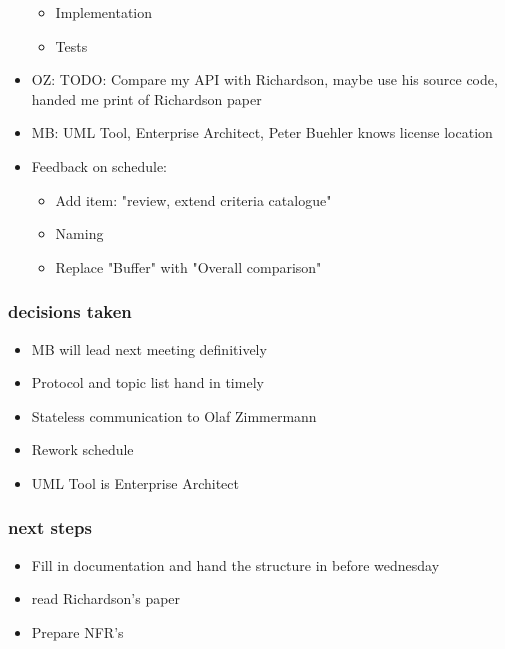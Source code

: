 \documentclass{article}
\begin{document}
\begin{itemize}
\begin{itemize}
            \item Implementation
            \item Tests
        \end{itemize}
    \item OZ: TODO: Compare my API with Richardson, maybe use his source code, handed me print of Richardson paper
    \item MB: UML Tool, Enterprise Architect, Peter Buehler knows license location
    \item Feedback on schedule:
        \begin{itemize}
            \item Add item: "review, extend criteria catalogue"
            \item Naming
            \item Replace "Buffer" with "Overall comparison"
        \end{itemize}
\end{itemize}

\subsubsection{decisions taken}
\begin{itemize}
    \item MB will lead next meeting definitively
    \item Protocol and topic list hand in timely
    \item Stateless communication to Olaf Zimmermann
    \item Rework schedule
    \item UML Tool is Enterprise Architect
\end{itemize}

\subsubsection{next steps}
\begin{itemize}
    \item Fill in documentation and hand the structure in before wednesday
    \item read Richardson's paper
    \item Prepare NFR's
\end{itemize}
\end{document}
